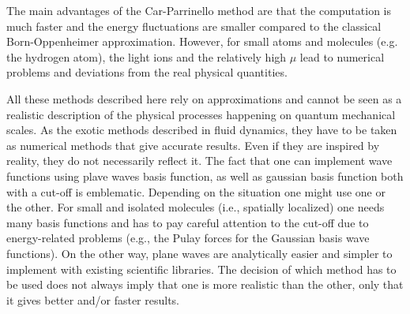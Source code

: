 The main advantages of the Car-Parrinello method are that the computation is much faster and the energy fluctuations are smaller compared to the classical Born-Oppenheimer approximation. However, for small atoms and molecules (e.g. the hydrogen atom), the light ions and the relatively high $\mu$ lead to numerical problems and deviations from the real physical quantities.

\vspace{0.7cm}


All these methods described here rely on approximations and cannot be seen as a realistic description of the physical processes happening on quantum mechanical scales. As the exotic methods described in fluid dynamics, they have to be taken as numerical methods that give accurate results. Even if they are inspired by reality, they do not necessarily reflect it. The fact that one can implement wave functions using plave waves basis function, as well as gaussian basis function both with a cut-off is emblematic. Depending on the situation one might use one or the other. For small and isolated molecules (i.e., spatially localized) one needs many basis functions and has to pay careful attention to the cut-off due to energy-related problems (e.g., the Pulay forces for the Gaussian basis wave functions). On the other way, plane waves are analytically easier and simpler to implement with existing scientific libraries. The decision of which method has to be used does not always imply that one is more realistic than the other, only that it gives better and/or faster results.
















